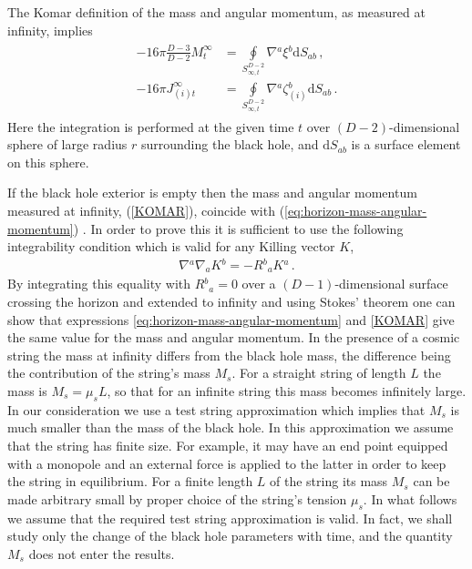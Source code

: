 \documentclass[superscriptaddress,twocolumn,showpacs,
preprintnumbers,amsmath,amssymb,nofootinbib,
longbibliography,aps,prd,10pt]{revtex4-1}
\newcommand{\dd}{\mbox{d}}
\newcommand{\n}[1]{\label{#1}}
\begin{document}
The Komar definition of the mass and angular momentum, as measured at infinity, implies
\begin{align}
\begin{split}\n{KOMAR}
-16\pi\frac{D-3}{D-2} M^\infty_{t} &= \oint\limits_{S^{D-2}_{\infty,t}}
\!\!\! \nabla{}^a \xi{}^b \dd S{}_{ab} \, , \\
-16\pi J^\infty_{(i) t} &= \oint\limits_{S^{D-2}_{\infty,t}} \!\!\! \nabla{}^a \zeta{}_{(i)}^b \dd S{}_{ab} \, .
\end{split}
\end{align}
Here the integration is performed at the given time $t$ over $(D-2)$-dimensional sphere of large radius $r$ surrounding the black hole, and $\dd S{}_{ab}$ is a surface element on this sphere.

If the black hole exterior is empty then the mass and angular momentum measured at infinity, (\ref{KOMAR}), coincide with (\ref{eq:horizon-mass-angular-momentum}) \cite{Myers:1986un}. In order to prove this it is sufficient to use the following integrability condition which is valid for any Killing vector $K$,
\begin{align}
\nabla{}^a \nabla{}_a K{}^b = -R{}^b{}_a K{}^a \, . \label{eq:integrability-killing-vector}
\end{align}
By integrating this equality with $R{}^b{}_a=0$ over a $(D-1)$-dimensional surface crossing the horizon and extended to infinity and using Stokes' theorem one can show that expressions \eqref{eq:horizon-mass-angular-momentum} and \eqref{KOMAR} give the same value for the mass and angular momentum. In the presence of a cosmic string the mass at infinity differs from the black hole mass, the difference being the contribution of the string's mass $M_s$. For a straight string of length $L$ the mass is $M_s=\mu_s L$, so that for an infinite string this mass becomes infinitely large. In our consideration we use a test string approximation which implies that $M_s$ is much smaller than the mass of the black hole. In this approximation we assume that the string has finite size. For example, it may have an end point equipped with a monopole and an external force is applied to the latter in order to keep the string in equilibrium. For a finite length $L$ of the string its mass $M_s$ can be made arbitrary small by proper choice of the string's tension $\mu_s$. In what follows we assume that the required test string approximation is valid. In fact, we shall study only the change of the black hole parameters with time, and the quantity $M_s$ does not enter the results.
\end{document}
